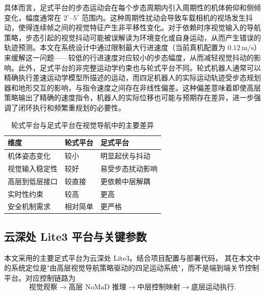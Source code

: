 具体而言，足式平台的步态运动会在每个步态周期内引入周期性的机体俯仰和侧倾变化，幅度通常在 $2^\circ\text{--}5^\circ$ 范围内。这种周期性扰动会导致车载相机的视场发生抖动，使得连续帧之间的视觉特征产生非平移性变化。对于依赖时序视觉输入的导航策略，步态引起的视觉抖动可能被误解读为环境变化或自身运动，从而产生错误的轨迹预测。本文在系统设计中通过限制最大行进速度（当前真机配置为 $0.12\,\text{m/s}$）来缓解这一问题——较低的行进速度对应较小的步态幅度，从而减轻视觉抖动的影响。此外，足式平台的非完整运动学约束也与轮式平台不同。轮式机器人通常可以精确执行差速运动学模型所描述的运动，而四足机器人的实际运动轨迹受步态规划器和地形交互的影响，与指令速度之间存在非线性偏差。这种偏差意味着即使高层策略输出了精确的速度指令，机器人的实际位移也可能与预期存在差异，进一步强调了闭环执行和频繁重规划的必要性。

\begin{table}[htbp]
    \centering
    \caption{轮式平台与足式平台在视觉导航中的主要差异}
    \label{tab:wheel-leg-compare}
    \begin{tabular}{lll}
        \toprule
        维度 & 轮式平台 & 足式平台 \\
        \midrule
        机体姿态变化 & 较小 & 明显起伏与抖动 \\
        视觉输入稳定性 & 较好 & 易受步态扰动影响 \\
        高层到低层接口 & 较直接 & 更依赖中层解耦 \\
        实时性约束 & 较高 & 更高 \\
        安全机制需求 & 相对简单 & 更严格 \\
        \bottomrule
    \end{tabular}
\end{table}

\subsection{云深处 Lite3 平台与关键参数}

本文采用的主要足式平台为云深处 Lite3。结合项目配置与部署代码，
其在本文中的系统定位是"由高层视觉导航策略驱动的四足运动系统"，而不是端到端关节控制平台。对应控制链路为
\begin{equation}
\text{视觉观察} \rightarrow \text{高层 NoMaD 推理} \rightarrow \text{中层控制映射} \rightarrow \text{底层运动执行}.
\end{equation}

